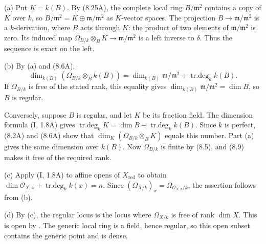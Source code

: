 (a) Put $K=k(B)$. By (8.25A), the complete local ring $B/\mathfrak m^2$ contains a copy of $K$ over $k$, so $B/\mathfrak m^2=K\oplus\mathfrak m/\mathfrak m^2$ as $K$-vector spaces. The projection $B\to\mathfrak m/\mathfrak m^2$ is a $k$-derivation, where $B$ acts through $K$: the product of two elements of $\mathfrak m/\mathfrak m^2$ is zero. Its induced map $\Omega_{B/k}\otimes_B K\to\mathfrak m/\mathfrak m^2$ is a left inverse to $\delta$. Thus the sequence is exact on the left.

(b) By (a) and (8.6A),
\[\dim_{k(B)}(\Omega_{B/k}\otimes_B k(B))=\dim_{k(B)}\mathfrak m/\mathfrak m^2+\operatorname{tr.deg}_k k(B).\]
If $\Omega_{B/k}$ is free of the stated rank, this equality gives $\dim_{k(B)}\mathfrak m/\mathfrak m^2=\dim B$, so $B$ is regular.

Conversely, suppose $B$ is regular, and let $K$ be its fraction field. The dimension formula (I, 1.8A) gives $\operatorname{tr.deg}_k K=\dim B+\operatorname{tr.deg}_k k(B)$. Since $k$ is perfect, (8.2A) and (8.6A) show that $\dim_K(\Omega_{B/k}\otimes_B K)$ equals this number. Part (a) gives the same dimension over $k(B)$. Now $\Omega_{B/k}$ is finite by (8.5), and (8.9) makes it free of the required rank.

(c) Apply (I, 1.8A) to affine opens of $X_{\mathrm{red}}$ to obtain $\dim\mathcal O_{X,x}+\operatorname{tr.deg}_k k(x)=n$. Since $(\Omega_{X/k})_x=\Omega_{\mathcal O_{X,x}/k}$, the assertion follows from (b).

(d) By (c), the regular locus is the locus where $\Omega_{X/k}$ is free of rank $\dim X$. This is open by . The generic local ring is a field, hence regular, so this open subset contains the generic point and is dense.
